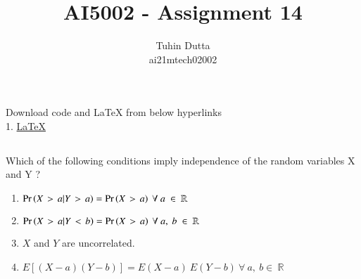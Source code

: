 \documentclass[journal,12pt,twocolumn]{IEEEtran}
\begin{document}
\providecommand{\mtx}[1]{\mathbf{#1}}
\providecommand{\fourier}{\overset{\mathcal{F}}{ \rightleftharpoons}}
\providecommand{\system}{\overset{\mathcal{H}}{ \longleftrightarrow}}
\newcommand{\solution}{\noindent \textbf{Solution: }}
\newcommand{\cosec}{\,\text{cosec}\,}
\providecommand{\dec}[2]{\ensuremath{\overset{#1}{\underset{#2}{\gtrless}}}}
\newcommand{\myvec}[1]{\ensuremath{\begin{pmatrix}#1\end{pmatrix}}}
\newcommand{\mydet}[1]{\ensuremath{\begin{vmatrix}#1\end{vmatrix}}}
\makeatletter
{}
\makeatother
\let\StandardTheFigure\thefigure
\let\vec\mathbf
\renewcommand{\thefigure}{\theproblem}
\def\putbox#1#2#3{\makebox[0in][l]{\makebox[#1][l]{}\raisebox{\baselineskip}[0in][0in]{\raisebox{#2}[0in][0in]{#3}}}}
     \def\rightbox#1{\makebox[0in][r]{#1}}
     \def\centbox#1{\makebox[0in]{#1}}
     \def\topbox#1{\raisebox{-\baselineskip}[0in][0in]{#1}}
     \def\midbox#1{\raisebox{-0.5\baselineskip}[0in][0in]{#1}}
\vspace{3cm}
\title{AI5002 - Assignment 14}
\author{Tuhin Dutta\\ ai21mtech02002}
\maketitle
\newpage
\bigskip
\renewcommand{\thefigure}{\theenumi}
\renewcommand{\thetable}{\theenumi}
\begin{mdframed}
Download code and LaTeX from below hyperlinks\\
1. \href{https://github.com/Tauhait/AI5002/tree/main/Assignment-14/LaTeX}{LaTeX}
\end{mdframed}
\subsection*{}
Which of the following conditions imply independence of the random variables X
and Y ?\\
\begin{enumerate}
    \item {} $\pr{X\ \mathop{>}\ a|Y\ \mathop{>}\ a} = \pr{X\ \mathop{>}\ a}\ \forall\ a\ \in\ \mathbb{R}$\\ 
    \item {} $\pr{X\ \mathop{>}\ a|Y\ \mathop{<}\ b} = \pr{X\ \mathop{>}\ a}\ \forall\ a,\ b\ \in\ \mathbb{R}$\\ 
    \item {} $X$ and $Y$ are uncorrelated.\\
    \item {} $E[(X-a)(Y-b)] = E(X-a)\ E(Y-b)\ \forall\ a,\ b \in\ \mathbb{R}$\\
\end{enumerate}
\end{document}
